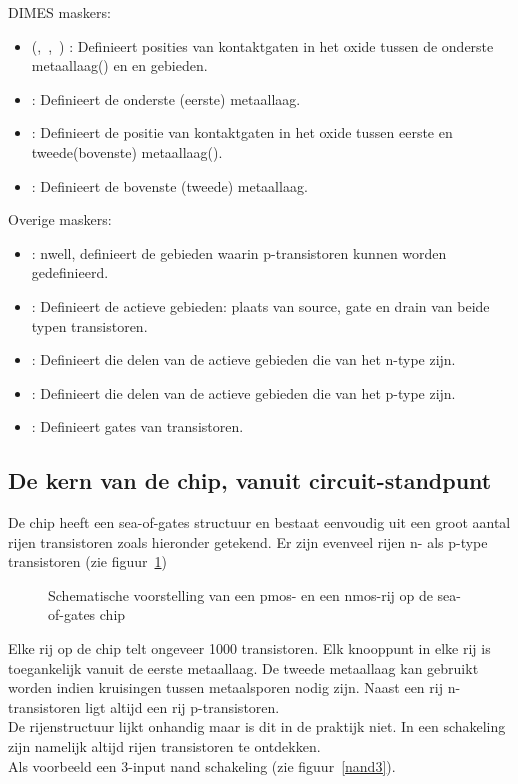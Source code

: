 DIMES maskers:
\begin{itemize}
\item
{} (,~,~) : Definieert posities van kontaktgaten in het
oxide tussen de onderste metaallaag() en  en 
gebieden.
\item
{} : Definieert de onderste (eerste) metaallaag.
\item
{} : Definieert de positie van kontaktgaten in het oxide
tussen eerste en tweede(bovenste) metaallaag().
\item
{} : Definieert de bovenste (tweede) metaallaag.
\end{itemize}
Overige maskers:
\begin{itemize}
\item
{} :  nwell, definieert de gebieden waarin p-transistoren kunnen
worden gedefinieerd.
\item
{} : Definieert de actieve gebieden: plaats van source, gate en
drain van beide typen transistoren.
\item
{} : Definieert die delen van de actieve gebieden die van het 
n-type zijn.
\item
{} : Definieert die delen van de actieve gebieden die van het 
p-type zijn.
\item
{} : Definieert gates van transistoren.
\end{itemize}
\subsection{De kern van de chip,
vanuit circuit-standpunt}

De chip heeft een sea-of-gates structuur en bestaat eenvoudig 
uit een groot aantal rijen transistoren zoals hieronder getekend.
Er zijn evenveel rijen n- als p-type transistoren (zie figuur~\ref{pnrij})

\begin{figure}[hbt]
\centerline{}
\caption{Schematische voorstelling van een pmos- en een nmos-rij op de sea-of-gates chip
\label{pnrij}}
\end{figure}


Elke rij op de chip telt ongeveer 1000 transistoren. Elk knooppunt
in elke rij is toegankelijk vanuit de eerste metaallaag. De tweede
metaallaag kan gebruikt worden indien kruisingen tussen metaalsporen
nodig zijn. Naast een rij n-transistoren ligt altijd een rij 
p-transistoren.\\
De rijenstructuur lijkt onhandig maar is dit in de praktijk niet.
In een schakeling zijn namelijk altijd rijen transistoren te ontdekken.\\
Als voorbeeld een 3-input nand schakeling (zie figuur~\ref{nand3}).

